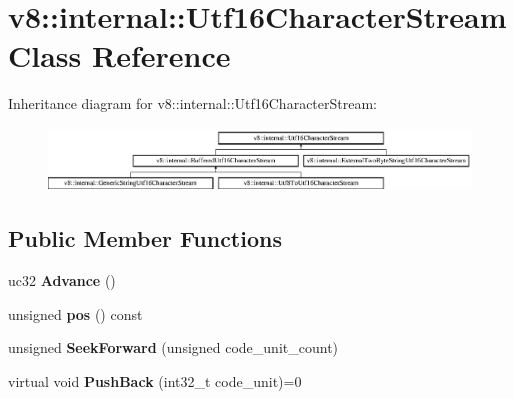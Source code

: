 \hypertarget{classv8_1_1internal_1_1_utf16_character_stream}{}\section{v8\+:\+:internal\+:\+:Utf16\+Character\+Stream Class Reference}
\label{classv8_1_1internal_1_1_utf16_character_stream}
Inheritance diagram for v8\+:\+:internal\+:\+:Utf16\+Character\+Stream\+:\begin{figure}[H]
\begin{center}
\leavevmode
\includegraphics[height=1.647059cm]{classv8_1_1internal_1_1_utf16_character_stream}
\end{center}
\end{figure}
\subsection*{Public Member Functions}
\begin{DoxyCompactItemize}
\item 
\hypertarget{classv8_1_1internal_1_1_utf16_character_stream_a411192b2cf2212fcc3a1167a46906b79}{}uc32 {\bfseries Advance} ()\label{classv8_1_1internal_1_1_utf16_character_stream_a411192b2cf2212fcc3a1167a46906b79}

\item 
\hypertarget{classv8_1_1internal_1_1_utf16_character_stream_a87bbc2ccd720ae9f1012fd72855611ad}{}unsigned {\bfseries pos} () const \label{classv8_1_1internal_1_1_utf16_character_stream_a87bbc2ccd720ae9f1012fd72855611ad}

\item 
\hypertarget{classv8_1_1internal_1_1_utf16_character_stream_a3a7af14e36b5993c9566f3d115579a31}{}unsigned {\bfseries Seek\+Forward} (unsigned code\+\_\+unit\+\_\+count)\label{classv8_1_1internal_1_1_utf16_character_stream_a3a7af14e36b5993c9566f3d115579a31}

\item 
\hypertarget{classv8_1_1internal_1_1_utf16_character_stream_a138dd8744238634296b0790a76c645b1}{}virtual void {\bfseries Push\+Back} (int32\+\_\+t code\+\_\+unit)=0\label{classv8_1_1internal_1_1_utf16_character_stream_a138dd8744238634296b0790a76c645b1}

\end{DoxyCompactItemize}
